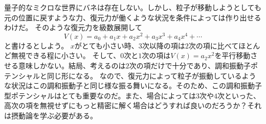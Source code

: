 量子的なミクロな世界にバネは存在しない。しかし、粒子が移動しようとしても元の位置に戻すような力、復元力が働くような状況を条件によっては作り出せるわけだ。
そのような復元力を級数展開して
\begin{equation}
  V(x) = a_0 + a_1 x + a_2 x^2 + a_3 x^3 + a_4 x^4 + \cdots
\end{equation}
と書けるとしよう。
$x$がとても小さい時、$3$次以降の項は$2$次の項に比べてほとんど無視できる程に小さい。
そして、$0$次と$1$次の項は$V(x) = a_2 x^2$を平行移動させる意味しかない。結局、考えるのは$2$次の項だけで十分であり、調和振動子ポテンシャルと同じ形になる。
なので、復元力によって粒子が振動しているような状況はこの調和振動子と同じ様な振る舞いになる。そのため、この調和振動子型ポテンシャルはとても重要なのだ。また、場合によっては$3$次や$4$次といった、高次の項を無視せずにもっと精密に解く場合はどうすれば良いのだろうか？それは摂動論を学ぶ必要がある。
